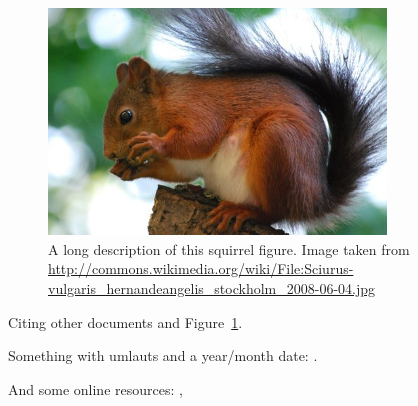 \begin{figure}[tbp]
  \centering
  \includegraphics[width=0.8\textwidth]{images/squirrel}
  \caption[Short description]{A long description of this squirrel figure.
  Image taken from
  \url{http://commons.wikimedia.org/wiki/File:Sciurus-vulgaris_hernandeangelis_stockholm_2008-06-04.jpg}}
  \label{fig:squirrel}
\end{figure}

Citing \cite{bellard2005qfa} other documents \cite{bellard2005qfa, boileau06}
and Figure~\ref{fig:squirrel}.

Something with umlauts and a year/month date:
\cite{becher04:_feurig_hacken_mit_firew}.

And some online resources: \cite{green04}, \cite{patent:4819234}

\cleardoublepage

